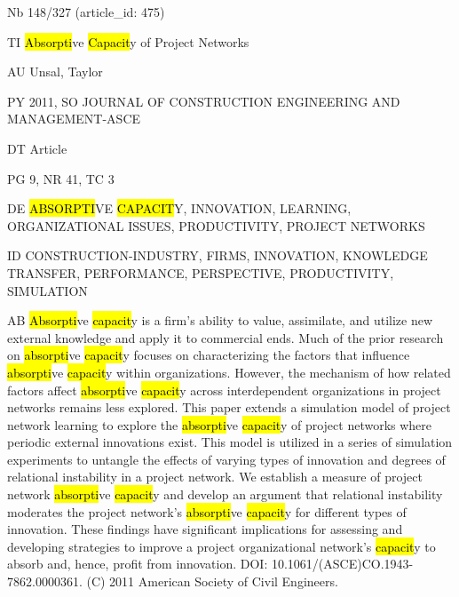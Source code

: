 \documentclass[a4paper]{article}
\begin{document}
\vspace*{-2cm}
Nb \tabto{0cm}148/327 (article\_id: 475)\par
TI \tabto{0cm}\hl{Absorpti}ve \hl{Capacit}y of Project Networks\par
AU \tabto{0cm}Unsal, Taylor\par
PY \tabto{0cm}2011, SO JOURNAL OF CONSTRUCTION ENGINEERING AND MANAGEMENT-ASCE\par
DT \tabto{0cm}Article\par
PG \tabto{0cm}9, NR 41, TC 3\par
DE \tabto{0cm}\hl{ABSORPTI}VE \hl{CAPACIT}Y, INNOVATION, LEARNING, ORGANIZATIONAL ISSUES, PRODUCTIVITY, PROJECT NETWORKS\par
ID \tabto{0cm}CONSTRUCTION-INDUSTRY, FIRMS, INNOVATION, KNOWLEDGE TRANSFER, PERFORMANCE, PERSPECTIVE, PRODUCTIVITY, SIMULATION\par
AB \tabto{0cm}\hl{Absorpti}ve \hl{capacit}y is a firm's ability to value, assimilate, and utilize new external knowledge and apply it to commercial ends. Much of the prior research on \hl{absorpti}ve \hl{capacit}y focuses on characterizing the factors that influence \hl{absorpti}ve \hl{capacit}y within organizations. However, the mechanism of how related factors affect \hl{absorpti}ve \hl{capacit}y across interdependent organizations in project networks remains less explored. This paper extends a simulation model of project network learning to explore the \hl{absorpti}ve \hl{capacit}y of project networks where periodic external innovations exist. This model is utilized in a series of simulation experiments to untangle the effects of varying types of innovation and degrees of relational instability in a project network. We establish a measure of project network \hl{absorpti}ve \hl{capacit}y and develop an argument that relational instability moderates the project network's \hl{absorpti}ve \hl{capacit}y for different types of innovation. These findings have significant implications for assessing and developing strategies to improve a project organizational network's \hl{capacit}y to absorb and, hence, profit from innovation. DOI: 10.1061/(ASCE)CO.1943-7862.0000361. (C) 2011 American Society of Civil Engineers.\par
\clearpage
\end{document}
